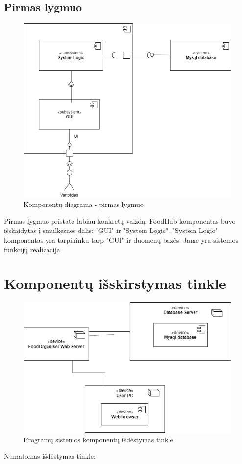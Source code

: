 \documentclass{VUMIFInfKursinis}
\begin{document}
\subsection{Pirmas lygmuo}
\begin{figure}[H]
    \centering
 \includegraphics[scale=0.6]{img/DiagKompOne}
    \caption{Komponentų diagrama - pirmas lygmuo}   %
    \label{img:mlp}
\end{figure}
\bigskip
Pirmas lygmuo pristato labiau konkretų vaizdą. FoodHub komponentas buvo išskaidytas į smulkesnes dalis: "GUI" ir "System Logic". "System Logic" komponentas yra tarpininku tarp "GUI" ir duomenų bazės. Jame yra sistemos funkcijų realizacija.


\section{Komponentų išskirstymas tinkle}
\begin{figure}[H]
    \centering
 \includegraphics[scale=0.6]{img/foodkomp}
    \caption{Programų sistemos komponentų išdėstymas tinkle}   %
    \label{img:mlp}
\end{figure}
\bigskip
Numatomas išdėstymas tinkle:
\end{document}
